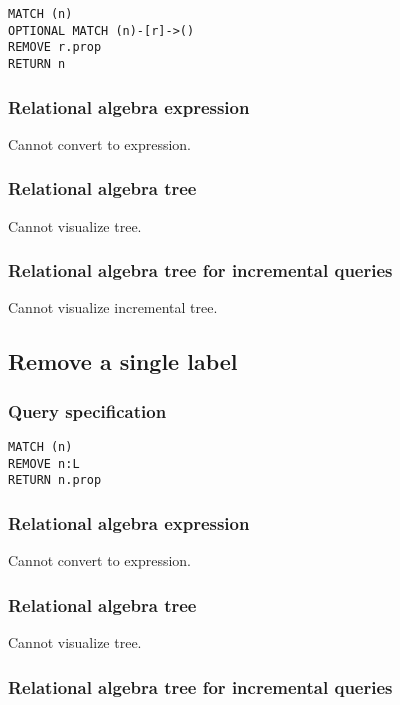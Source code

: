 \begin{lstlisting}
MATCH (n)
OPTIONAL MATCH (n)-[r]->()
REMOVE r.prop
RETURN n
\end{lstlisting}

\subsubsection*{Relational algebra expression}

Cannot convert to expression.

\subsubsection*{Relational algebra tree}

Cannot visualize tree.

\subsubsection*{Relational algebra tree for incremental queries}

Cannot visualize incremental tree.

\subsection{Remove a single label}

\subsubsection*{Query specification}

\begin{lstlisting}
MATCH (n)
REMOVE n:L
RETURN n.prop
\end{lstlisting}

\subsubsection*{Relational algebra expression}

Cannot convert to expression.

\subsubsection*{Relational algebra tree}

Cannot visualize tree.

\subsubsection*{Relational algebra tree for incremental queries}

